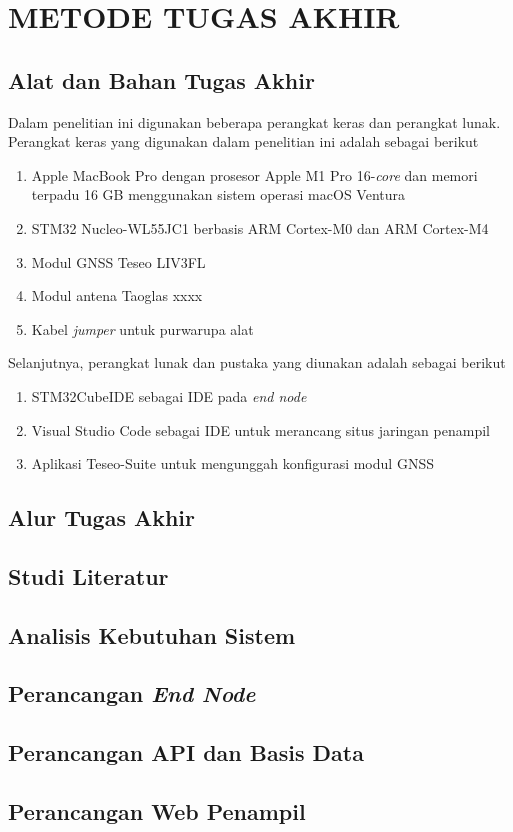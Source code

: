 \chapter{METODE TUGAS AKHIR}

\section{Alat dan Bahan Tugas Akhir}
Dalam penelitian ini digunakan beberapa perangkat keras dan perangkat lunak. Perangkat keras yang digunakan dalam penelitian ini adalah sebagai berikut
\begin{enumerate}
	\item Apple MacBook Pro dengan prosesor Apple M1 Pro 16-\textit{core} dan memori terpadu 16 GB menggunakan sistem operasi macOS Ventura
	\item STM32 Nucleo-WL55JC1 berbasis ARM Cortex-M0 dan ARM Cortex-M4
	\item Modul GNSS Teseo LIV3FL
	\item Modul antena Taoglas xxxx
	\item Kabel \textit{jumper} untuk purwarupa alat
\end{enumerate}
Selanjutnya, perangkat lunak dan pustaka yang diunakan adalah sebagai berikut
\begin{enumerate}
	\item STM32CubeIDE sebagai IDE pada \textit{end node}
	\item Visual Studio Code sebagai IDE untuk merancang situs jaringan penampil
	\item Aplikasi Teseo-Suite untuk mengunggah konfigurasi modul GNSS
\end{enumerate}

\section{Alur Tugas Akhir}

\section{Studi Literatur}

\section{Analisis Kebutuhan Sistem}

\section{Perancangan \textit{End Node}}

\section{Perancangan API dan Basis Data}

\section{Perancangan Web Penampil}